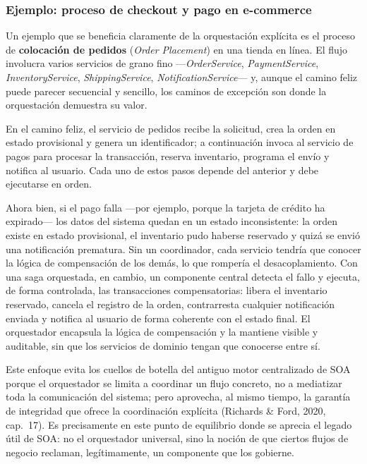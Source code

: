 \subsubsection{Ejemplo: proceso de checkout y pago en e-commerce}

Un ejemplo que se beneficia claramente de la orquestación explícita es el proceso de
\textbf{colocación de pedidos} (\emph{Order Placement}) en una tienda en línea. El
flujo involucra varios servicios de grano fino ---\emph{OrderService},
\emph{PaymentService}, \emph{InventoryService}, \emph{ShippingService},
\emph{NotificationService}--- y, aunque el camino feliz puede parecer secuencial y
sencillo, los caminos de excepción son donde la orquestación demuestra su valor.

En el camino feliz, el servicio de pedidos recibe la solicitud, crea la orden en
estado provisional y genera un identificador; a continuación invoca al servicio de
pagos para procesar la transacción, reserva inventario, programa el envío y notifica
al usuario. Cada uno de estos pasos depende del anterior y debe ejecutarse en orden.

Ahora bien, si el pago falla ---por ejemplo, porque la tarjeta de crédito ha
expirado--- los datos del sistema quedan en un estado inconsistente: la orden existe
en estado provisional, el inventario pudo haberse reservado y quizá se envió una
notificación prematura. Sin un coordinador, cada servicio tendría que conocer la
lógica de compensación de los demás, lo que rompería el desacoplamiento. Con una saga
orquestada, en cambio, un componente central detecta el fallo y ejecuta, de forma
controlada, las transacciones compensatorias: libera el inventario reservado, cancela
el registro de la orden, contrarresta cualquier notificación enviada y notifica al
usuario de forma coherente con el estado final. El orquestador encapsula la lógica de
compensación y la mantiene visible y auditable, sin que los servicios de dominio
tengan que conocerse entre sí.

Este enfoque evita los cuellos de botella del antiguo motor centralizado de SOA
porque el orquestador se limita a coordinar un flujo concreto, no a mediatizar toda
la comunicación del sistema; pero aprovecha, al mismo tiempo, la garantía de
integridad que ofrece la coordinación explícita (Richards \& Ford, 2020, cap.~17).
Es precisamente en este punto de equilibrio donde se aprecia el legado útil de SOA:
no el orquestador universal, sino la noción de que ciertos flujos de negocio
reclaman, legítimamente, un componente que los gobierne.
